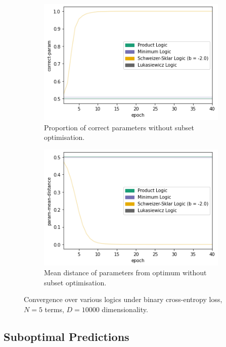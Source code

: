 \begin{figure}[h]
\begin{subfigure}[t]{0.45\textwidth}
        \includegraphics[width=\textwidth]{imgs/conj-cp-10000dim-5t-bce.png}
        \caption{Proportion of correct parameters without subset optimisation.}
        \label{fig:conjconvcpbce}
    \end{subfigure}
    \begin{subfigure}[t]{0.45\textwidth}
        \centering
        \includegraphics[width=\textwidth]{imgs/conj-pmd-10000dim-5t-bce.png}
        \caption{Mean distance of parameters from optimum without subset optimisation.}
        \label{fig:conjconvpmdbce}
    \end{subfigure}
       \caption{Convergence over various logics under binary cross-entropy loss, $N=5$ terms, $D=10000$ dimensionality.}
       \label{fig:conjconvlogicsbce}
\end{figure}

\subsection{Suboptimal Predictions}

